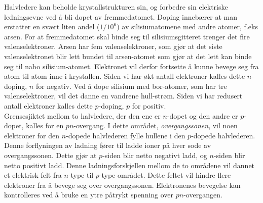 \documentclass[%
 reprint,
 amsmath,amssymb,
 aps,
 norsk,
 booktabs
]{revtex4-1}
\begin{document}
Halvledere kan beholde krystallstrukturen sin, og forbedre sin elektriske ledningsevne ved å bli dopet av fremmedatomet. Doping innebærer at man erstatter en svært liten andel ($1/10^6$) av silisiumatomene med andre atomer, f.eks arsen. For at fremmedatomet skal binde seg til silisiumsgitteret trenger det fire valenselektroner. Arsen har fem valenselektroner, som gjør at det siste valenselektronet blir lett bundet til arsen-atomet som gjør at det lett kan binde seg til nabo silisium-atomet. Elektronet vil derfor fortsette å kunne bevege seg fra atom til atom inne i krystallen. Siden vi har økt antall elektroner kalles dette $n$-doping, $n$ for negativ. Ved å dope silisium med bor-atomer, som har tre valenselektroner, vil det danne en vandrene hull-strøm. Siden vi har redusert antall elektroner kalles dette $p$-doping, $p$ for positiv.\\
Grensesjiktet mellom to halvledere, der den ene er $n$-dopet og den andre er $p$-dopet, kalles for en $pn$-overgang. I dette området, \textit{overgangssonen}, vil noen elektroner for den $n$-dopede halvlederen fylle hullene i den $p$-dopede halvlederen. Denne forflyningen av ladning fører til ladde ioner på hver sode av overgangssonen. Dette gjør at $p$-siden blir netto negativt ladd, og $n$-siden blir netto positivt ladd. Denne ladningsforskjellen mellom de to områdene vil dannet et elektrisk felt fra $n$-type til $p$-type området. Dette feltet vil hindre flere elektroner fra å bevege seg over overgangssonen. Elektronenes bevegelse kan kontrolleres ved å bruke en ytre påtrykt spenning over $pn$-overgangen.\\
\end{document}
